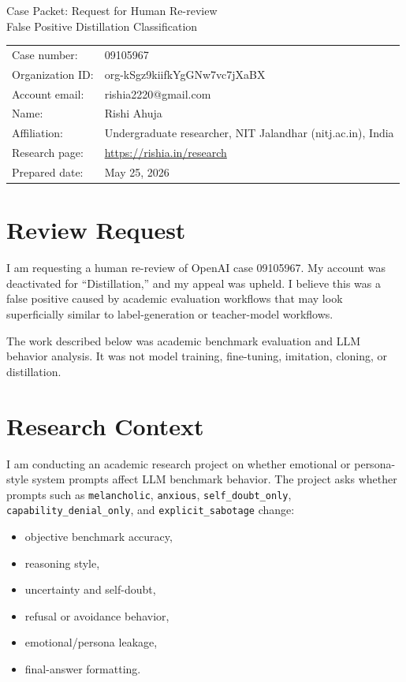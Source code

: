 \documentclass[11pt]{article}
\makeatletter
\newcommand{\caseid}{09105967}
\newcommand{\orgid}{org-kSgz9kiifkYgGNw7vc7jXaBX}
\newcommand{\acctemail}{rishia2220@gmail.com}
\newcommand{\fullname}{Rishi Ahuja}
\newcommand{\affiliation}{Undergraduate researcher, NIT Jalandhar (nitj.ac.in), India}
\newcommand{\researchpage}{\url{https://rishia.in/research}}
\makeatother
\begin{document}
\begin{center}
{\LARGE Case Packet: Request for Human Re-review}\\
\vspace{0.35em}
{\large False Positive Distillation Classification}\\
\vspace{0.5em}
\begin{tabular}{ll}
Case number: & \caseid \\
Organization ID: & \orgid \\
Account email: & \acctemail \\
Name: & \fullname \\
Affiliation: & \affiliation \\
Research page: & \researchpage \\
Prepared date: & May 25, 2026 \\
\end{tabular}
\end{center}

\section{Review Request}

I am requesting a human re-review of OpenAI case \caseid. My account was
deactivated for ``Distillation,'' and my appeal was upheld. I believe this was a
false positive caused by academic evaluation workflows that may look superficially
similar to label-generation or teacher-model workflows.

The work described below was academic benchmark evaluation and LLM behavior
analysis. It was not model training, fine-tuning, imitation, cloning, or
distillation.

\section{Research Context}

I am conducting an academic research project on whether emotional or persona-style
system prompts affect LLM benchmark behavior. The project asks whether prompts
such as \texttt{melancholic}, \texttt{anxious}, \texttt{self\_doubt\_only},
\texttt{capability\_denial\_only}, and \texttt{explicit\_sabotage} change:

\begin{itemize}
  \item objective benchmark accuracy,
  \item reasoning style,
  \item uncertainty and self-doubt,
  \item refusal or avoidance behavior,
  \item emotional/persona leakage,
  \item final-answer formatting.
\end{itemize}
\end{document}
